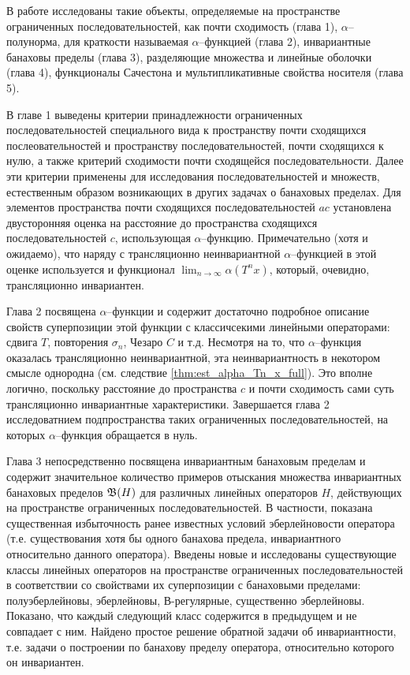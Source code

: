 В работе исследованы такие объекты, определяемые на пространстве ограниченных последовательностей,
как почти сходимость (глава 1), $\alpha$--полунорма, для краткости называемая $\alpha$--функцией (глава 2),
инвариантные банаховы пределы (глава 3), разделяющие множества и линейные оболочки (глава 4),
функционалы Сачестона и мультипликативные свойства носителя (глава 5).

В главе 1 выведены критерии принадлежности ограниченных последовательностей
специального вида к пространству почти сходящихся послеовательностей
и пространству последовательностей, почти сходящихся к нулю,
а также критерий сходимости почти сходящейся последовательности.
Далее эти критерии применены для исследования последовательностей и множеств,
естественным образом возникающих в других задачах о банаховых пределах.
Для элементов пространства почти сходящихся последовательностей $ac $
установлена двусторонняя оценка на расстояние до пространства сходящихся последовательностей $c$,
использующая $\alpha$--функцию.
Примечательно (хотя и ожидаемо), что наряду с трансляционно неинвариантной $\alpha$--функцией
в этой оценке используется и функционал $\lim_{n\to\infty}\alpha(T^n x)$,
который, очевидно, трансляционно инвариантен.

Глава 2 посвящена $\alpha$--функции и содержит достаточно подробное описание
свойств суперпозиции этой функции с классичсекими линейными операторами:
сдвига $T$, повторения $\sigma_n$, Чезаро $C$ и т.д.
Несмотря на то, что $\alpha$--функция оказалась трансляционно неинвариантной,
эта неинвариантность в некотором смысле однородна (см. следствие \ref{thm:est_alpha_Tn_x_full}).
Это вполне логично, поскольку расстояние до пространства $c$ и почти сходимость
сами суть трансляционно инвариантные характеристики.
Завершается глава 2 исследоватнием подпространства таких ограниченных последовательностей,
на которых $\alpha$--функция обращается в нуль.

Глава 3 непосредственно посвящена инвариантным банаховым пределам и содержит
значительное количество примеров отыскания множества инвариантных банаховых пределов $\mathfrak{B}(H)$
для различных линейных операторов $H$, действующих на пространстве ограниченных последовательностей.
В частности, показана существенная избыточность ранее известных условий эберлейновости оператора
(т.е. существования хотя бы одного банахова предела, инвариантного относительно данного оператора).
Введены новые и исследованы существующие классы линейных операторов на пространстве ограниченных последовательностей
в соответствии со свойствами их суперпозиции с банаховыми пределами:
полуэберлейновы, эберлейновы, В-регулярные, существенно эберлейновы.
Показано, что каждый следующий класс содержится в предыдущем и не совпадает с ним.
Найдено простое решение обратной задачи об инвариантности,
т.е. задачи о построении по банахову пределу оператора, относительно которого он инвариантен.

